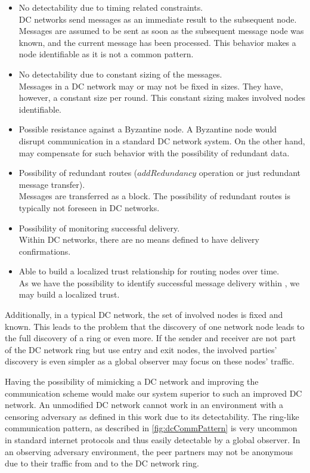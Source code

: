 \begin{itemize}
	\item No detectability due to timing related constraints.\\
	DC networks send messages as an immediate result to the subsequent node. Messages are assumed to be sent as soon as the subsequent message node was known, and the current message has been processed. This behavior makes a node identifiable as it is not a common pattern.
	\item No detectability due to constant sizing of the messages.\\
	Messages in a DC network may or may not be fixed in sizes. They have, however, a constant size per round. This constant sizing makes involved nodes identifiable.
	\item Possible resistance against a Byzantine node.
	A Byzantine node would disrupt communication in a standard DC network system. On the other hand, \MessageVortex{} may compensate for such behavior with the possibility of redundant data.
	\item Possibility of redundant routes ($addRedundancy$ operation or just redundant message transfer).\\
	Messages are transferred as a block. The possibility of redundant routes is typically not foreseen in DC networks.
	\item Possibility of monitoring successful delivery.\\
	Within DC networks, there are no means defined to have delivery confirmations.
	\item Able to build a localized trust relationship for routing nodes over time.\\
	As we have the possibility to identify successful message delivery within \MessageVortex{}, we may build a localized trust.
\end{itemize}

Additionally, in a typical DC network, the set of involved nodes is fixed and known. This leads to the problem that the discovery of one network node leads to the full discovery of a ring or even more. If the sender and receiver are not part of the DC network ring but use entry and exit nodes, the involved parties' discovery is even simpler as a global observer may focus on these nodes' traffic. 

Having the possibility of mimicking a DC network and improving the communication scheme would make our system superior to such an improved DC network. An unmodified DC network cannot work in an environment with a censoring adversary as defined in this work due to its detectability. The ring-like communication pattern, as described in \cref{fig:dcCommPattern} is very uncommon in standard internet protocols and thus easily detectable by a global observer. In an observing adversary environment, the peer partners may not be anonymous due to their traffic from and to the DC network ring.

